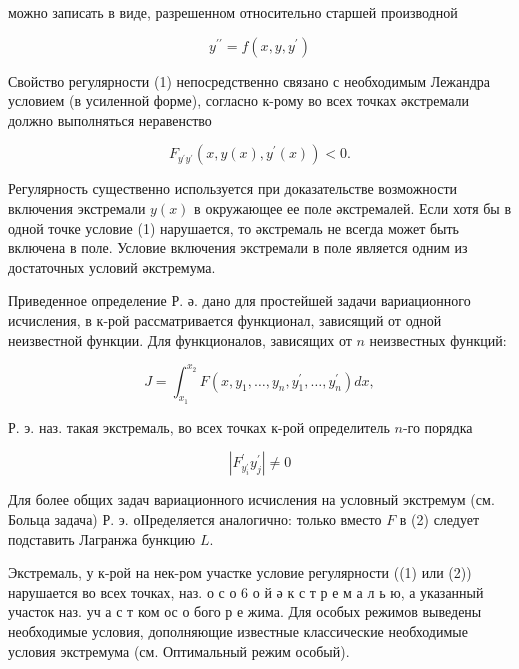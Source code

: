 \documentclass[10pt]{article}
\begin{document}
можно записать в виде, разрешенном относительно старшей производной



\[

y^{\prime \prime}=f\left(x, y, y^{\prime}\right)

\]



Свойство регулярности (1) непосредственно связано с необходимым Лежандра условием (в усиленной форме), согласно к-рому во всех точках әкстремали должно выполняться неравенство



\[

F_{y^{\prime} y^{\prime}}\left(x, y(x), y^{\prime}(x)\right)<0 .

\]



Регулярность существенно используется при доказательстве возможности включения экстремали $y(x)$ в окружающее ее поле әкстремалей. Если хотя бы в одной точке условие (1) нарушается, то әкстремаль не всегда может быть включена в поле. Условие включения экстремали в поле является одним из достаточных условий әкстремума.



Приведенное определение Р. ә. дано для простейшей задачи вариационного исчисления, в к-рой рассматривается функционал, зависящий от одной неизвестной функции. Для функционалов, зависящих от $n$ неизвестных функций:



\[

J=\int_{x_{1}}^{x_{2}} F\left(x, y_{1}, \ldots, y_{n}, y_{1}^{\prime}, \ldots, y_{n}^{\prime}\right) d x,

\]



Р. э. наз. такая экстремаль, во всех точках к-рой определитель $n$-го порядка



\[

\left|F_{y_{i}^{\prime}}^{\prime} y_{j}^{\prime}\right| \neq 0

\]



Для более общих задач вариационного исчисления на условный экстремум (см. Больца задача) Р. э. оІІределяется аналогично: только вместо $F$ в (2) следует подставить Лагранжа бункцию $L$.



Экстремаль, у к-рой на нек-ром участке условие регулярности ((1) или (2)) нарушается во всех точках, наз. о с о 6 о й ә к с т р е м а л ь ю, а указанный участок наз. уч а с т ком ос о бого р е жима. Для особых режимов выведены необходимые условия, дополняющие известные классические необходимые условия экстремума (см. Оптимальный режим особый).
\end{document}
